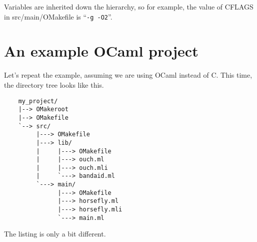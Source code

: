Variables are inherited down the hierarchy, so for example, the value of CFLAGS in
src/main/OMakefile is ``\verb+-g -O2+''.

\section{An example OCaml project}

Let's repeat the example, assuming we are using OCaml instead of C.
This time, the directory tree looks like this.

\begin{verbatim}
    my_project/
    |--> OMakeroot
    |--> OMakefile
    `--> src/
         |---> OMakefile
         |---> lib/
         |     |---> OMakefile
         |     |---> ouch.ml
         |     |---> ouch.mli
         |     `---> bandaid.ml
         `---> main/
               |---> OMakefile
               |---> horsefly.ml
               |---> horsefly.mli
               `---> main.ml
\end{verbatim}

The listing is only a bit different.

